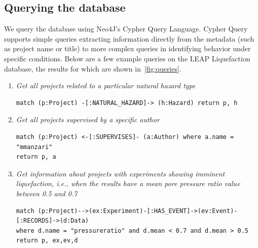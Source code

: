 \documentclass[acmsmall]{acmart}
\begin{document}
\subsection{Querying the database}
\label{sec:org431f08b}
We query the database using Neo4J's Cypher Query Language. 
Cypher Query supports simple queries extracting information directly from the metadata (such as project name or title) to more complex queries in identifying behavior under specific conditions. 
Below are a few example queries on the LEAP
Liquefaction database, the results for which are shown in~\cref{fig:queries}.
\begin{enumerate}
\item \emph{Get all projects related to a particular natural hazard type}
\begin{verbatim}
match (p:Project) -[:NATURAL_HAZARD]-> (h:Hazard) return p, h
\end{verbatim}

\item \emph{Get all projects supervised by a specific author}
\begin{verbatim}
match (p:Project) <-[:SUPERVISES]- (a:Author) where a.name = "mmanzari" 
return p, a
\end{verbatim}
\item \emph{Get information about projects with experiments showing imminent liquefaction, i.e., when the results have a mean pore pressure ratio value between 0.5 and 0.7}
\begin{verbatim}
match (p:Project)-->(ex:Experiment)-[:HAS_EVENT]->(ev:Event)-[:RECORDS]->(d:Data) 
where d.name = "pressureratio" and d.mean < 0.7 and d.mean > 0.5 return p, ex,ev,d
\end{verbatim}
\end{enumerate}


\end{document}
